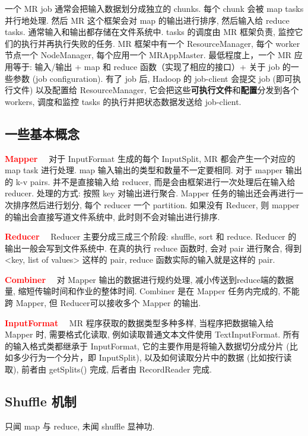一个 MR job 通常会把输入数据划分成独立的 chunks. 每个 chunk 会被 map tasks 并行地处理. 然后 MR 这个框架会对 map 的输出进行排序, 然后输入给 reduce tasks. 通常输入和输出都存储在文件系统中. tasks 的调度由 MR 框架负责, 监控它们的执行并再执行失败的任务. MR 框架中有一个 ResourceManager, 每个 worker 节点一个 NodeManager, 每个应用一个 MRAppMaster. 最低程度上，一个 MR 应用等于: 输入/输出 + map 和 reduce 函数（实现了相应的接口）+ 关于 job 的一些参数 (job configuration). 有了 job 后, Hadoop 的 job-client 会提交 job (即可执行文件) 以及配置给 ResourceManager, 它会把这些\textbf{可执行文件}和\textbf{配置}分发到各个 workers, 调度和监控 tasks 的执行并把状态数据发送给 job-client.

\subsection{一些基本概念}

\par{\textbf{\textcolor{red}{Mapper}}}$\quad$ 对于 InputFormat 生成的每个 InputSplit, MR 都会产生一个对应的 map task 进行处理. map 输入输出的类型和数量不一定要相同. 对于 mapper 输出的 k-v pairs. 并不是直接输入给 reducer, 而是会由框架进行一次处理后在输入给 reducer. 处理的方式: 按照 key 对输出进行聚合. Mapper 任务的输出还会再进行一次排序然后进行划分, 每个 reducer 一个 partition. 如果没有 Reducer, 则 mapper 的输出会直接写道文件系统中, 此时则不会对输出进行排序. 

\par{\textbf{\textcolor{red}{Reducer}}}$\quad$ Reducer 主要分成三成三个阶段: shuffle, sort 和 reduce. Reducer 的输出一般会写到文件系统中. 在真的执行 reduce 函数时, 会对 pair 进行聚合, 得到 <key, list of values> 这样的 pair, reduce 函数实际的输入就是这样的 pair. 

\par{\textbf{\textcolor{red}{Combiner}}}$\quad$ 对 Mapper 输出的数据进行规约处理, 减小传送到reduce端的数据量, 缩短传输时间和作业的整体时间. Combiner 是在 Mapper 任务内完成的, 不能跨 Mapper, 但 Reducer可以接收多个 Mapper 的输出.

\par{\textbf{\textcolor{red}{InputFormat}}}$\quad$ MR 程序获取的数据类型多种多样, 当程序把数据输入给 Mapper 时, 需要格式化读取, 例如读取普通文本文件使用 TextInputFormat. 所有的输入格式类都继承于 InputFormat, 它的主要作用是将输入数据切分成分片 (比如多少行为一个分片，即 InputSplit), 以及如何读取分片中的数据 (比如按行读取), 前者由 getSplits() 完成, 后者由 RecordReader 完成.

\subsection{Shuffle 机制}
只闻 map 与 reduce, 未闻 shuffle 显神功. 

